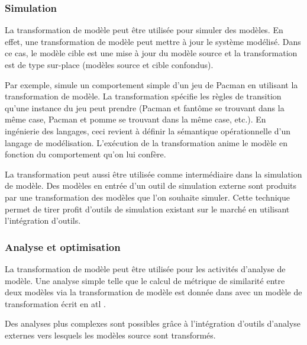 
\subsubsection{Simulation}

La transformation de modèle peut être utilisée pour simuler des modèles. En 
effet, une transformation de modèle peut mettre à jour le système modélisé. Dans 
ce cas, le modèle cible est une mise à jour du modèle source et la 
transformation est de type sur-place (modèles source et cible confondus). 

Par exemple, \cite{syriani2011multi} simule un comportement simple d'un jeu de 
Pacman en utilisant la transformation de modèle. La transformation spécifie les 
règles de transition qu'une instance du jeu peut prendre (Pacman et fantôme se 
trouvant dans la même case, Pacman et pomme se trouvant dans la même case, 
etc.). En ingénierie des langages, ceci revient à définir la sémantique 
opérationnelle d'un langage de modélisation. L'exécution de la transformation 
anime le modèle en fonction du comportement qu'on lui confère.

La transformation peut aussi être utilisée comme intermédiaire dans la 
simulation de modèle. Des modèles en entrée d'un outil de simulation externe 
sont produits par une transformation des modèles que l'on souhaite simuler. Cette 
technique permet de tirer profit d'outils de simulation existant sur le marché 
en utilisant l'intégration d'outils.

\subsubsection{Analyse et optimisation}

La transformation de modèle peut être utilisée pour les activités d'analyse de 
modèle. Une analyse simple telle que le calcul de métrique de similarité entre 
deux modèles via la transformation de modèle est donnée dans \cite{del2007semi} 
avec un modèle de transformation écrit en \gls{atl} \cite{jouault2006transforming}. 

Des analyses plus complexes sont possibles grâce à l'intégration d'outils 
d'analyse externes vers lesquels les modèles source sont transformés.

